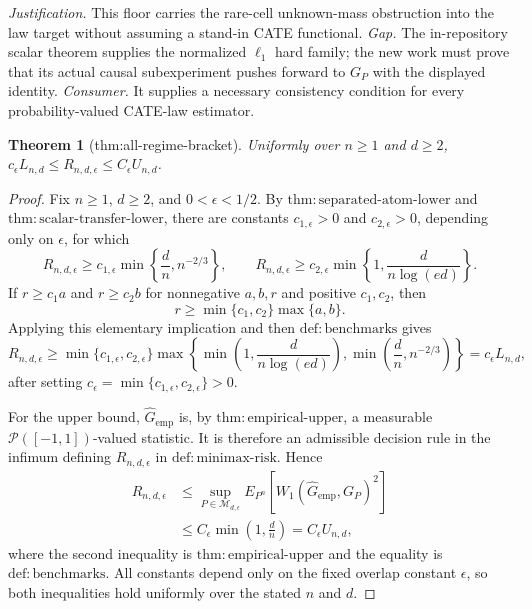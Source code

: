 \documentclass{article}
\newtheorem{theorem}{Theorem}
\begin{document}
\par\smallskip\noindent \textit{Justification.} This floor carries the rare-cell unknown-mass obstruction into the law target without assuming a stand-in CATE functional. \textit{Gap.} The in-repository scalar theorem supplies the normalized \(\ell_1\) hard family; the new work must prove that its actual causal subexperiment pushes forward to \(G_P\) with the displayed identity. \textit{Consumer.} It supplies a necessary consistency condition for every probability-valued CATE-law estimator.

\begin{theorem}[thm:all-regime-bracket]\label{thm:all-regime-bracket}
Uniformly over \(n\ge1\) and \(d\ge2\), \(c_\epsilon L_{n,d}\le R_{n,d,\epsilon}\le C_\epsilon U_{n,d}\).
\end{theorem}
\begin{proof}
Fix \(n\geq 1\), \(d\geq 2\), and \(0<\epsilon<1/2\).  By \(\mathrm{thm:separated\mbox{-}atom\mbox{-}lower}\) and \(\mathrm{thm:scalar\mbox{-}transfer\mbox{-}lower}\), there are constants \(c_{1,\epsilon}>0\) and \(c_{2,\epsilon}>0\), depending only on \(\epsilon\), for which
\[
 R_{n,d,\epsilon}\geq c_{1,\epsilon}\min\!\left\{\frac dn,n^{-2/3}\right\},
 \qquad
 R_{n,d,\epsilon}\geq c_{2,\epsilon}\min\!\left\{1,\frac{d}{n\log(ed)}\right\}.
\]
If \(r\geq c_1 a\) and \(r\geq c_2 b\) for nonnegative \(a,b,r\) and positive \(c_1,c_2\), then
\[
 r\geq \min\{c_1,c_2\}\max\{a,b\}.
\]
Applying this elementary implication and then \(\mathrm{def:benchmarks}\) gives
\[
 R_{n,d,\epsilon}\geq
 \min\{c_{1,\epsilon},c_{2,\epsilon}\}
 \max\!\left\{
   \min\!\left(1,\frac{d}{n\log(ed)}\right),
   \min\!\left(\frac dn,n^{-2/3}\right)
 \right\}
 =c_\epsilon L_{n,d},
\]
after setting \(c_\epsilon=\min\{c_{1,\epsilon},c_{2,\epsilon}\}>0\).

For the upper bound, \(\widehat G_{\mathrm{emp}}\) is, by \(\mathrm{thm:empirical\mbox{-}upper}\), a measurable \(\mathcal P([-1,1])\)-valued statistic.  It is therefore an admissible decision rule in the infimum defining \(R_{n,d,\epsilon}\) in \(\mathrm{def:minimax\mbox{-}risk}\).  Hence
\[
 \begin{aligned}
 R_{n,d,\epsilon}
 &\leq \sup_{P\in\mathcal M_{d,\epsilon}}
 E_{P^n}\!\left[W_1(\widehat G_{\mathrm{emp}},G_P)^2\right] \\
 &\leq C_\epsilon\min\!\left(1,\frac dn\right)
 =C_\epsilon U_{n,d},
 \end{aligned}
\]
where the second inequality is \(\mathrm{thm:empirical\mbox{-}upper}\) and the equality is \(\mathrm{def:benchmarks}\).  All constants depend only on the fixed overlap constant \(\epsilon\), so both inequalities hold uniformly over the stated \(n\) and \(d\).
\end{proof}
\end{document}
